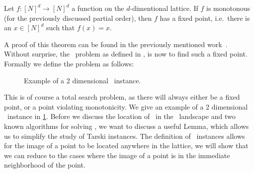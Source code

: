 \begin{theorem}
    Let $f : {[N]}^d \rightarrow {[N]}^d$ a function on the $d$-dimentional lattice. If $f$ is monotonous (for the previously discussed partial order), then $f$ has a fixed point, i.e.\ there is an $x \in {[N]}^d$ such that $f(x)=x$.
\end{theorem}

A proof of this theorem can be found in the previously mentioned work~\cite{tarski_lattice-theoretical_1955}. Without surprise, the \Tarski\ problem as defined in , is now to find such a fixed point. Formally we define the problem as follows:

\begin{figure}
    \centering
    \caption[Example of a \Tarski\ instance]{Example of a 2 dimensional \Tarski\ instance.}
    \label{fig:tarski_example}
\end{figure}

This is of course a total search problem, as there will always either be a fixed point, or a point violating monotonicity. We give an example of a 2 dimensional \Tarski\ instance in \cref{fig:tarski_example}. Before we discuss the location of \Tarski\ in the \TFNP\ landscape and two known algorithms for solving \Tarski, we want to discuss a useful Lemma, which allows us to simplify the study of Tarski instances. The definition of \Tarski\ instances allows for the image of a point to be located anywhere in the lattice, we will show that we can reduce to the cases where the image of a point is in the immediate neighborhood of the point.

